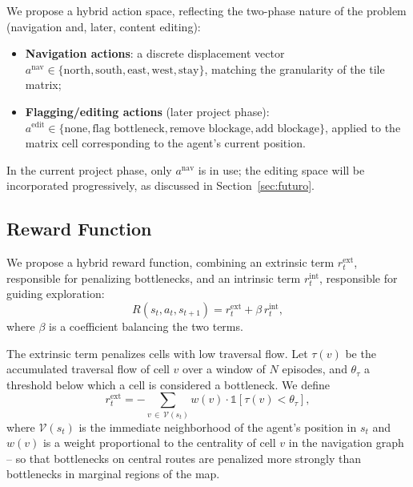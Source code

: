 \documentclass[sigconf,nonacm,language=english]{acmart}
\begin{document}
We propose a hybrid action space, reflecting the two-phase nature of the
problem (navigation and, later, content editing):
\begin{itemize}
  \item \textbf{Navigation actions}: a discrete displacement vector
    $a^{\text{nav}} \in \{\text{north}, \text{south}, \text{east},
    \text{west}, \text{stay}\}$, matching the granularity of the tile
    matrix;
  \item \textbf{Flagging/editing actions} (later project phase):
    $a^{\text{edit}} \in \{\text{none}, \text{flag bottleneck}, \text{remove
    blockage}, \text{add blockage}\}$, applied to the matrix cell
    corresponding to the agent's current position.
\end{itemize}
In the current project phase, only $a^{\text{nav}}$ is in use; the editing
space will be incorporated progressively, as discussed in
Section~\ref{sec:futuro}.

\subsection{Reward Function}
\label{sec:recompensa}

We propose a hybrid reward function, combining an extrinsic term
$r^{\text{ext}}_t$, responsible for penalizing bottlenecks, and an
intrinsic term $r^{\text{int}}_t$, responsible for guiding exploration:
\begin{equation}
  R(s_t, a_t, s_{t+1}) = r^{\text{ext}}_t + \beta \, r^{\text{int}}_t,
  \label{eq:reward}
\end{equation}
where $\beta$ is a coefficient balancing the two terms.

The extrinsic term penalizes cells with low traversal flow. Let $\tau(v)$
be the accumulated traversal flow of cell $v$ over a window of $N$
episodes, and $\theta_\tau$ a threshold below which a cell is considered a
bottleneck. We define
\begin{equation}
  r^{\text{ext}}_t = -\sum_{v \,\in\, \mathcal{V}(s_t)} w(v) \cdot
    \mathbb{1}\!\left[\tau(v) < \theta_\tau\right],
  \label{eq:reward-ext}
\end{equation}
where $\mathcal{V}(s_t)$ is the immediate neighborhood of the agent's
position in $s_t$ and $w(v)$ is a weight proportional to the centrality of
cell $v$ in the navigation graph -- so that bottlenecks on central routes
are penalized more strongly than bottlenecks in marginal regions of the
map.
\end{document}
